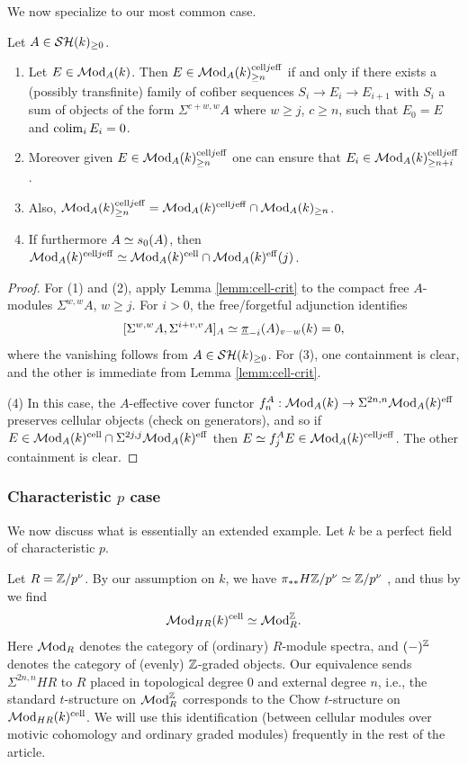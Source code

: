 \documentclass{amsart}
\numberwithin{proposition}{section}
\numberwithin{equation}{section}
\def\cell{\mathrm{cell}}
\begin{document}
We now specialize to our most common case.
\begin{corollary} \label{cor:module-cellular-criterion}
Let $A \in \mathcal{SH}(k)_{\ge 0}$.
\begin{enumerate}
\item Let $E \in \mathcal{M}\mathrm{od}_A(k)$.
  Then $E \in \Mod_A(k)^{\cell j \eff}_{\ge n}$ if and only if there exists a (possibly transfinite) family of cofiber sequences $S_i \to E_i \to E_{i+1}$ with $S_i$ a sum of objects of the form $\Sigma^{c+w,w} A$ where $w \ge j$, $c \ge n$, such that $E_0 = E$ and $\operatorname*{colim}_i E_i = 0$.
\item Moreover given $E \in \Mod_A(k)^{\cell j \eff}_{\ge n}$ one can ensure that $E_i \in \Mod_A(k)^{\cell j \eff}_{\ge n+i}$.
\item Also, $\Mod_A(k)^{\cell j \eff}_{\ge n} = \Mod_A(k)^{\cell j \eff} \cap \Mod_A(k)_{\ge n}$.
\item If furthermore $A \simeq s_0(A)$, then $\Mod_A(k)^{\cell j \eff} \wequi \Mod_A(k)^{\cell} \cap \Mod_A(k)^{\eff}(j)$.
\end{enumerate}
\end{corollary}
\begin{proof}
For (1) and (2), apply Lemma \ref{lemm:cell-crit} to the compact free $A$-modules $\Sigma^{w,w}A$, $w\ge j$.
For $i>0$, the free/forgetful adjunction identifies
\[
[\Sigma^{w,w}A,\Sigma^{i+v,v}A]_A
\simeq \underline\pi_{-i}(A)_{v-w}(k)=0,
\]
where the vanishing follows from $A\in\mathcal{SH}(k)_{\ge0}$.
For (3), one containment is clear, and the other is immediate from Lemma \ref{lemm:cell-crit}.

(4) In this case, the $A$-effective cover functor $f_n^A: \mathcal{M}\mathrm{od}_A(k) \to \Sigma^{2n,n}\mathcal{M}\mathrm{od}_A(k)^{\mathrm{eff}}$ preserves cellular objects (check on generators), and so if $E \in \Mod_A(k)^{\cell} \cap \Sigma^{2j,j}\Mod_A(k)^{\eff}$ then $E \wequi f_j^A E \in \Mod_A(k)^{\cell j \eff}$.
The other containment is clear.
\end{proof}

\subsubsection{Characteristic $p$ case} \label{subsub:charp}
We now discuss what is essentially an extended example.
Let $k$ be a perfect field of characteristic $p$.

Let $R = \mathbb{Z}/p^\nu$.
By our assumption on $k$, we have $\pi_{**}H\mathbb{Z}/p^\nu \simeq \mathbb{Z}/p^\nu$ \cite[Theorem~1.1]{geisser2000k}, and thus by \cite[Theorem~5.1.1]{schwede-shipley2003modules} we find \[ \Mod_{HR}(k)^\cell \wequi \Mod_{R}^\Z. \]
Here $\mathcal{M}\mathrm{od}_{R}$ denotes the category of (ordinary) $R$-module spectra, and $(\mathord-)^{\mathbb{Z}}$ denotes the category of (evenly) $\mathbb{Z}$-graded objects.
Our equivalence sends $\Sigma^{2n,n}HR$ to $R$ placed in topological degree $0$ and external degree $n$, i.e., the standard $t$-structure on $\mathcal{M}\mathrm{od}_{R}^{\mathbb{Z}}$ corresponds to the Chow $t$-structure on $\Mod_{HR}(k)^\cell$.
We will use this identification (between cellular modules over motivic cohomology and ordinary graded modules) frequently in the rest of the article.
\end{document}
